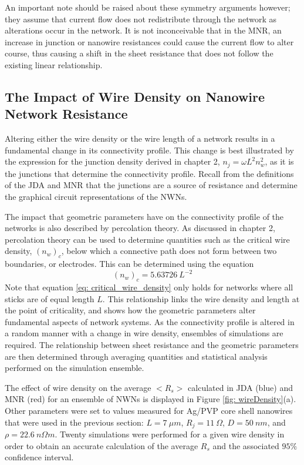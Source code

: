 An important note should be raised about these symmetry arguments however; they assume that current flow does not redistribute through the network as alterations occur in the network. It is not inconceivable that in the MNR, an increase in junction or nanowire resistances could cause the current flow to alter course, thus causing a shift in the sheet resistance that does not follow the existing linear relationship.

\subsection{The Impact of Wire Density on Nanowire Network Resistance}
\label{Sec: Geometric Properties}
Altering either the wire density or the wire length of a network results in a fundamental change in its connectivity profile. This change is best illustrated by the expression for the junction density derived in chapter 2, $n_j = \omega L^2 n_w^2$, as it is the junctions that determine the connectivity profile. Recall from the definitions of the JDA and MNR that the junctions are a source of resistance and determine the graphical circuit representations of the NWNs. 

The impact that geometric parameters have on the connectivity profile of the networks is also described by percolation theory\cite{pike1974}. As discussed in chapter 2, percolation theory can be used to determine quantities such as the critical wire density, $(n_w)_c$, below which a connective path does not form between two boundaries, or electrodes. This can be determined using the equation\cite{li2009} 
\begin{equation}
(n_w)_c = 5.63726 ~ L^{-2}
\label{eq: critical_wire_density}
\end{equation}
Note that equation \ref{eq: critical_wire_density} only holds for networks where all sticks are of equal length $L$. This relationship links the wire density and length at the point of criticality, and shows how the geometric parameters alter fundamental aspects of network systems. As the connectivity profile is altered in a random manner with a change in wire density, ensembles of simulations are required. The relationship between sheet resistance and the geometric parameters are then determined through averaging quantities and statistical analysis performed on the simulation ensemble.

The effect of wire density on the average $<R_s>$ calculated in JDA (blue) and MNR (red) for an ensemble of NWNs is displayed in Figure \ref{fig: wireDensity}(a). Other parameters were set to values measured for Ag/PVP core shell nanowires\cite{rocha2015} that were used in the previous section: $L = 7 ~ \mu m$, $R_j = 11 ~ \Omega$, $D = 50 ~ n m$, and $\rho = 22.6 ~ n\Omega m$. Twenty simulations were performed for a given wire density in order to obtain an accurate calculation of the average $R_s$ and the associated $95\%$ confidence interval. 

